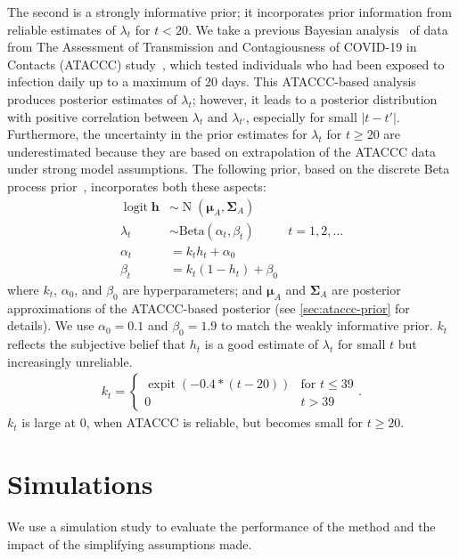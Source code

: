 \documentclass[12pt]{article}
\def\dist{\sim}
\DeclareMathOperator{\logit}{logit}
\DeclareMathOperator{\MNorm}{N}
\DeclareMathOperator{\expit}{expit}
\newcommand\matr{\bm}
\renewcommand{\vec}[1]{\bm{#1}}
\begin{document}
The second is a strongly informative prior; it incorporates prior information from reliable estimates of $\lambda_t$ for $t < 20$.
We take a previous Bayesian analysis~\citep{blakeThesis} of data from The Assessment of Transmission and Contagiousness of COVID-19 in Contacts (ATACCC) study~\citep{hakkiOnset}, which tested individuals who had been exposed to infection daily up to a maximum of 20 days.
This ATACCC-based analysis produces posterior estimates of $\lambda_t$; however, it leads to a posterior distribution with positive correlation between $\lambda_t$ and $\lambda_{t'}$, especially for small $|t-t'|$.
Furthermore, the uncertainty in the prior estimates for $\lambda_t$ for $t\geq20$ are underestimated because they are based on extrapolation of the ATACCC data under strong model assumptions.
The following prior, based on the discrete Beta process prior~\citep{ibrahimBayesian,sunStatisticala}, incorporates both these aspects:
\begin{align}
  \logit \vec{h} &\dist \MNorm(\vec{\mu}_A, \matr{\Sigma}_A) \\
  \lambda_t &\dist \text{Beta}(\alpha_t, \beta_t) &t = 1, 2, \dots \\
  \alpha_t &= k_t h_t + \alpha_0 \\
  \beta_t &= k_t (1 - h_t) + \beta_0
\end{align}
where $k_t$, $\alpha_0$, and $\beta_0$ are hyperparameters; and $\vec{\mu}_A$ and $\matr{\Sigma}_A$ are posterior approximations of the ATACCC-based posterior (see \cref{sec:ataccc-prior} for details).
We use $\alpha_0 = 0.1$ and $\beta_0 = 1.9$ to match the weakly informative prior.
$k_t$ reflects the subjective belief that $h_t$ is a good estimate of $\lambda_t$ for small $t$ but increasingly unreliable.
\begin{align}
k_t = \begin{cases}
  \expit(-0.4 * (t - 20)) &\text{for $t \leq 39$} \\
  0 &t > 39
\end{cases}.
\end{align}
$k_t$ is large at 0, when ATACCC is reliable, but becomes small for $t \geq 20$.


\section{Simulations} \label{sec:simulation}


We use a simulation study to evaluate the performance of the method and the impact of the simplifying assumptions made.
\end{document}
